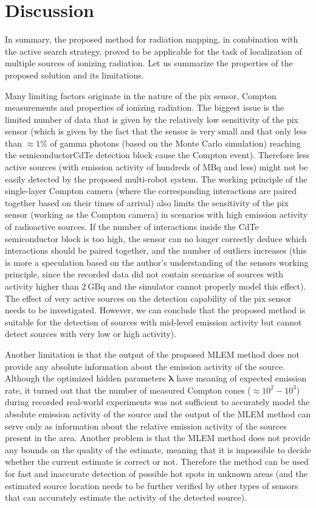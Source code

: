 \section{Discussion}
In summary, the proposed method for radiation mapping, in combination with the active search strategy, proved to be applicable for the task of localization of multiple sources of ionizing radiation.
Let us summarize the properties of the proposed solution and its limitations.

Many limiting factors originate in the nature of the \ac{pix} sensor, Compton measurements and properties of ionizing radiation.
The biggest issue is the limited number of data that is given by the relatively low sensitivity of the \ac{pix} sensor (which is given by the fact that the sensor is very small and that only less than $\approx 1\%$ of gamma photons (based on the Monte Carlo simulation) reaching the semiconductor\ac{CdTe} detection block cause the Compton event).
Therefore less active sources (with emission activity of hundreds of $\si{\mega\becquerel}$ and less) might not be easily detected by the proposed multi-robot system.
The working principle of the single-layer Compton camera (where the corresponding interactions are paired together based on their times of arrival) 
also limits the sensitivity of the \ac{pix} sensor (working as the Compton camera) in scenarios with high emission activity of radioactive sources.
If the number of interactions inside the \ac{CdTe} semiconductor block is too high, the sensor can no longer correctly deduce which interactions should be paired together, and the number of outliers increases (this is more a speculation based on the author's understanding of the sensors working principle, since the recorded data did not contain scenarios of sources with activity higher than $\SI{2}{\giga\becquerel}$ and the simulator cannot properly model this effect).
The effect of very active sources on the detection capability of the \ac{pix} sensor needs to be investigated.
However, we can conclude that the proposed method is suitable for the detection of sources with mid-level emission activity but cannot detect sources with very low or high activity).

Another limitation is that the output of the proposed \ac{MLEM} method does not provide any absolute information about the emission activity of the source.
Although the optimized hidden parameters $\bm{\lambda}$ have meaning of expected emission rate, 
it turned out that the number of measured Compton cones ($\approx 10^{2}-10^{3}$) during recorded real-world experiments was not sufficient to accurately model the absolute emission activity of the source
and the output of the \ac{MLEM} method can serve only as information about the relative emission activity of the sources present in the area.
Another problem is that the \ac{MLEM} method does not provide any bounds on the quality of the estimate, meaning that it is impossible to decide whether the current estimate is correct or not.
Therefore the method can be used for fast and inaccurate detection of possible hot spots in unknown areas (and the estimated source location needs to be further verified by other types of sensors that can accurately estimate the activity of the detected source).


